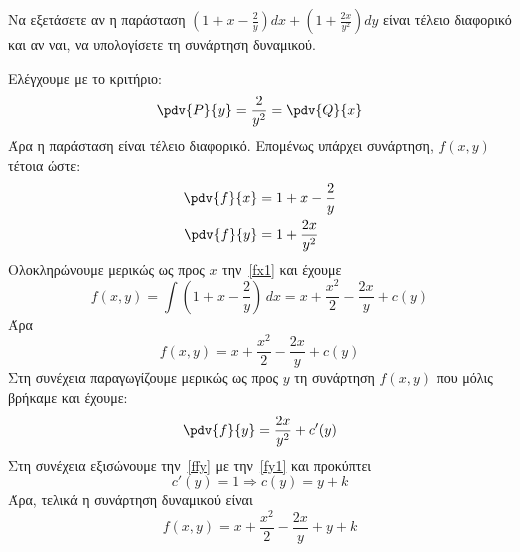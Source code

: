     \begin{example}
      Να εξετάσετε αν η παράσταση $ \left(1+x- \frac{2}{y}\right)dx + 
      \left(1+ \frac{2x}{y^{2}} \right)dy $ είναι τέλειο διαφορικό και αν ναι, να 
      υπολογίσετε τη συνάρτηση δυναμικού.
    \end{example}
    \begin{solution}
      Ελέγχουμε με το κριτήριο:
      \[ 
        \pdv{P}{y} = \frac{2}{y^{2}} = \pdv{Q}{x} 
      \]
      Άρα η παράσταση είναι τέλειο διαφορικό. Επομένως υπάρχει 
      συνάρτηση, $ f(x,y) $ τέτοια ώστε: 
      \begin{align}
        \pdv{f}{x} &= 1 + x - \frac{2}{y} \label{fx1} \\
        \pdv{f}{y} &= 1+ \frac{2x}{y^{2}} \label{fy1}
      \end{align}
      Ολοκληρώνουμε μερικώς ως προς $x$ την~\eqref{fx1} και έχουμε
      \[
        f(x,y) = \int \left(1+x- \frac{2}{y}\right) \,{dx} = x + 
        \frac{x^{2}}{2} - \frac{2x}{y} + c(y) 
      \] 
      Άρα  
      \begin{equation}
        f(x,y) = x + \frac{x^{2}}{2} - \frac{2x}{y} + c(y) \label{fxy}
      \end{equation}
      Στη συνέχεια παραγωγίζουμε μερικώς ως προς $y$ τη συνάρτηση $ f(x,y) $ που μόλις 
      βρήκαμε και έχουμε:
      \begin{equation}
        \pdv{f}{y} = \frac{2x}{y^{2}} + c'(y) \label{ffy}
      \end{equation} 
      Στη συνέχεια εξισώνουμε την~\eqref{ffy} με την~\eqref{fy1} και προκύπτει
      \[
        c'(y) = 1 \Rightarrow c(y) = y + k 
      \] 
      Άρα, τελικά η συνάρτηση δυναμικού είναι 
      \[
        f(x,y) = x + \frac{x^{2}}{2} - \frac{2x}{y} + y + k 
      \] 
    \end{solution}

